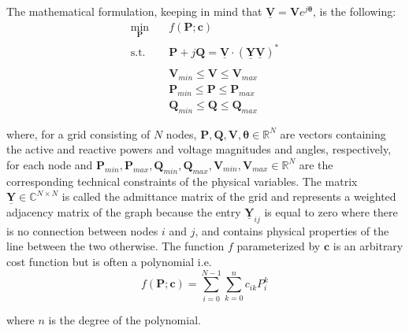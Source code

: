 The mathematical formulation, keeping in mind that $\boldsymbol{\underline{V}} = \boldsymbol{V}e^{j\boldsymbol{\theta}}$, is the following:
\begin{equation}
    \label{eq:opf_formulation}
    \begin{aligned}
        \min_{\boldsymbol{P}} \quad & f(\boldsymbol{P}; \boldsymbol{c})\\%
        \textrm{s.t.} %
        \quad & \boldsymbol{P} + j\boldsymbol{Q} = \underline{\boldsymbol{V}} \cdot \left(\underline{\boldsymbol{Y}}\underline{\boldsymbol{V}}\right)^*\\ \\
        \quad & \boldsymbol{V}_{min} \leq \boldsymbol{V} \leq \boldsymbol{V}_{max} \\
        \quad & \boldsymbol{P}_{min} \leq \boldsymbol{P} \leq \boldsymbol{P}_{max} \\
        \quad & \boldsymbol{Q}_{min} \leq \boldsymbol{Q} \leq \boldsymbol{Q}_{max}
    \end{aligned}
\end{equation}

\noindent where, for a grid consisting of $N$ nodes, $\boldsymbol{P}, \boldsymbol{Q}, \boldsymbol{V}, \boldsymbol{\theta} \in \mathbb{R}^N$ are vectors containing the
active and reactive powers and voltage magnitudes and angles, respectively, for each node and
$\boldsymbol{P}_{min}, \boldsymbol{P}_{max}, \boldsymbol{Q}_{min}, \boldsymbol{Q}_{max}, \boldsymbol{V}_{min}, \boldsymbol{V}_{max} \in \mathbb{R}^N$
are the corresponding technical constraints of the physical variables.
The matrix $\boldsymbol{\underline{Y}} \in \mathbb{C}^{N \times N}$ is called the admittance matrix
of the grid and represents a weighted adjacency matrix of the graph because the entry $\boldsymbol{\underline{Y}}_{ij}$ is equal
to zero where there is no connection between nodes $i$ and $j$, and contains physical properties of the line between the two otherwise.
The function $f$ parameterized by $\boldsymbol{c}$ is an arbitrary cost function but is often a polynomial i.e.
\[f(\boldsymbol{P}; \boldsymbol{c}) = \sum_{i=0}^{N - 1} \sum_{k=0}^n c_{ik}P_i^k\]

\noindent where $n$ is the degree of the polynomial.